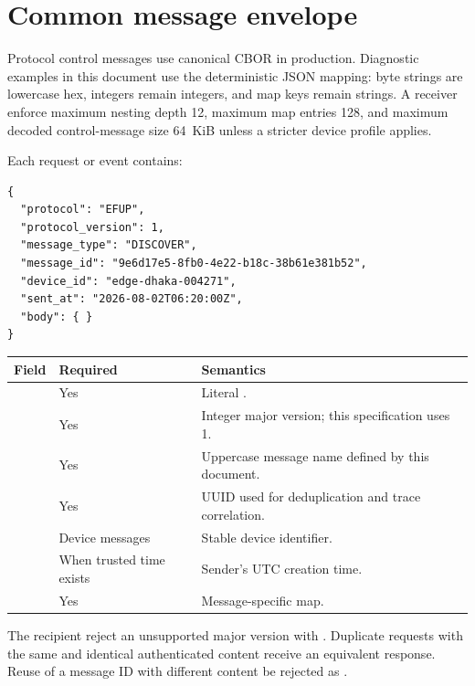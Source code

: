 \section{Common message envelope}

Protocol control messages use canonical CBOR in production. Diagnostic examples
in this document use the deterministic JSON mapping: byte strings are lowercase
hex, integers remain integers, and map keys remain strings. A receiver \must
enforce maximum nesting depth 12, maximum map entries 128, and maximum decoded
control-message size 64~KiB unless a stricter device profile applies.

Each request or event contains:

\begin{lstlisting}[language={},caption={Common logical envelope}]
{
  "protocol": "EFUP",
  "protocol_version": 1,
  "message_type": "DISCOVER",
  "message_id": "9e6d17e5-8fb0-4e22-b18c-38b61e381b52",
  "device_id": "edge-dhaka-004271",
  "sent_at": "2026-08-02T06:20:00Z",
  "body": { }
}
\end{lstlisting}

\begin{tabularx}{\textwidth}{@{}L{35mm}L{26mm}Y@{}}
  \toprule
  \textbf{Field} & \textbf{Required} & \textbf{Semantics} \\
  \midrule
   & Yes & Literal . \\
   & Yes & Integer major version; this specification uses 1. \\
   & Yes & Uppercase message name defined by this document. \\
   & Yes & UUID used for deduplication and trace correlation. \\
   & Device messages & Stable device identifier. \\
   & When trusted time exists & Sender's UTC creation time. \\
   & Yes & Message-specific map. \\
  \bottomrule
\end{tabularx}

The recipient \must reject an unsupported major version with
. Duplicate requests with the same
 and identical authenticated content \should receive an
equivalent response. Reuse of a message ID with different content \must be
rejected as .

